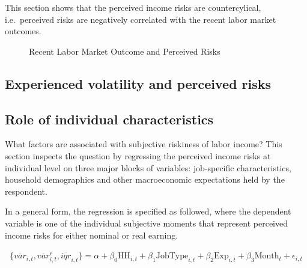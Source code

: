 \documentclass[12pt,notitlepage,onecolumn,aps,pra]{article}
\begin{document}
This section shows that the perceived income risks are countercylical,
i.e.~perceived risks are negatively correlated with the recent labor
market outcomes.


    \begin{figure}[!ht]
        \begin{center}\end{center}
        \caption{Recent Labor Market Outcome and Perceived Risks}
        \label{fig:tshe}
    \end{figure}
    


    \hypertarget{experienced-volatility-and-perceived-risks}{%
\subsection{Experienced volatility and perceived
risks}\label{experienced-volatility-and-perceived-risks}}


    \begin{figure}[!ht]
        \begin{center}\end{center}
        \caption{}
        \label{}
    \end{figure}
    

    \hypertarget{role-of-individual-characteristics}{%
\subsection{Role of individual
characteristics}\label{role-of-individual-characteristics}}

What factors are associated with subjective riskiness of labor income?
This section inspects the question by regressing the perceived income
risks at individual level on three major blocks of variables:
job-specific characteristics, household demographics and other
macroeconomic expectations held by the respondent.

In a general form, the regression is specified as followed, where the
dependent variable is one of the individual subjective moments that
represent perceived income risks for either nominal or real earning.

\begin{eqnarray}
\{\overline{var}_{i,t}, \overline{var}^r_{i,t}, \overline{iqr}_{i,t}\} = \alpha + \beta_0 \textrm{HH}_{i,t} + \beta_1 \textrm{JobType}_{i,t} + \beta_2 \textrm{Exp}_{i,t} + \beta_3 \textrm{Month}_t + \epsilon_{i,t}
\end{eqnarray}
\end{document}
